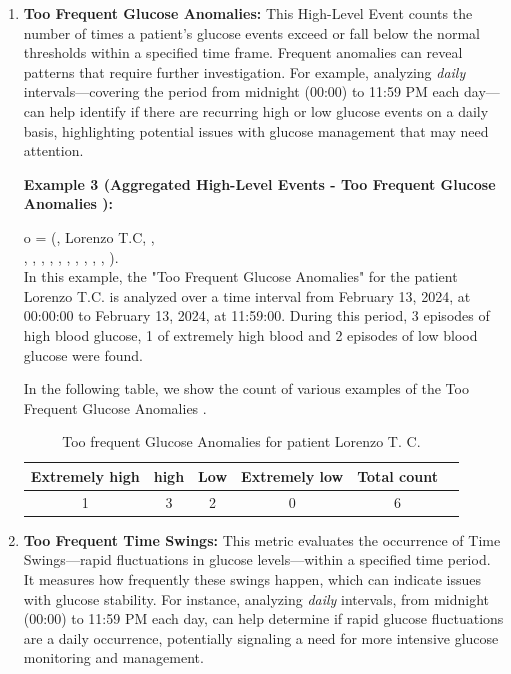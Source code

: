 \documentclass{article}
\begin{document}
\begin{enumerate}
  \item \textbf{Too Frequent Glucose Anomalies:} 
    This High-Level Event counts the number of times a patient's glucose events exceed or fall below the normal thresholds within a specified time frame. Frequent anomalies can reveal patterns that require further investigation. For example, analyzing \textit{daily} intervals—covering the period from midnight (00:00) to 11:59 PM each day—can help identify if there are recurring high or low glucose events on a daily basis, highlighting potential issues with glucose management that may need attention.\\
    \pagebreak
    
    \textbf{Example 3 (Aggregated High-Level Events - Too Frequent Glucose Anomalies ):}

     o = (, Lorenzo T.C, , \\ ,
    , , , , , , , , , ).\\
    
     In this example, the "Too Frequent Glucose Anomalies" for the patient Lorenzo T.C. is analyzed over a time interval from February 13, 2024, at 00:00:00 to February 13, 2024, at 11:59:00. During this period, 3 episodes of high blood glucose, 1 of extremely high blood and 2 episodes of low blood glucose were found.
    
    In the following table, we show the count of various examples of the Too Frequent Glucose Anomalies .
    
    \begin{table}[h!]
        \centering
        \begin{tabular}{|c|c|c|c|c|c|}
            \hline
            \textbf{Extremely high} &
            \textbf{high} & \textbf{Low} & \textbf{Extremely low} & \textbf{Total count}  \\
            \hline
            1 & 3 & 2 & 0 & 6 \\
            \hline
        \end{tabular}
        \caption{Too frequent Glucose Anomalies for patient Lorenzo T. C.}
        \label{tab:too_frequent_glucose_anomalies}
    \end{table}

    \item \textbf{Too Frequent Time Swings:} 
    This metric evaluates the occurrence of Time Swings—rapid fluctuations in glucose levels—within a specified time period. It measures how frequently these swings happen, which can indicate issues with glucose stability. For instance, analyzing \textit{daily} intervals, from midnight (00:00) to 11:59 PM each day, can help determine if rapid glucose fluctuations are a daily occurrence, potentially signaling a need for more intensive glucose monitoring and management.\\


\end{enumerate}
\end{document}
